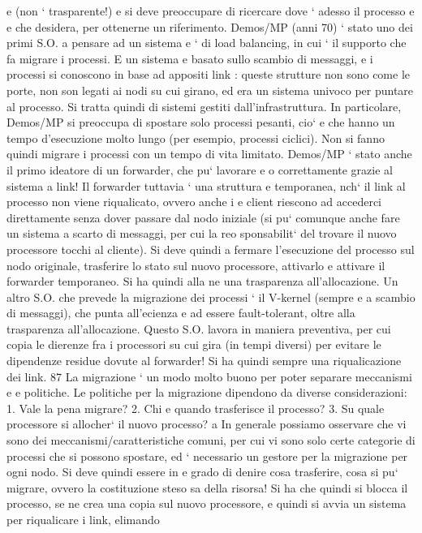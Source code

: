 \documentclass[a4paper,12pt]{article}
\begin{document}
e
(non ` trasparente!) e si deve preoccupare di ricercare dove ` adesso il processo
e
e
che desidera, per ottenerne un riferimento.
Demos/MP (anni 70) ` stato uno dei primi S.O. a pensare ad un sistema
e
`
di load balancing, in cui ` il supporto che fa migrare i processi. E un sistema
e
basato sullo scambio di messaggi, e i processi si conoscono in base ad appositi
link : queste strutture non sono come le porte, non son legati ai nodi su cui
girano, ed era un sistema univoco per puntare al processo. Si tratta quindi di
sistemi gestiti dall'infrastruttura.
In particolare, Demos/MP si preoccupa di spostare solo processi pesanti, cio`
e
che hanno un tempo d'esecuzione molto lungo (per esempio, processi ciclici).
Non si fanno quindi migrare i processi con un tempo di vita limitato.
Demos/MP ` stato anche il primo ideatore di un forwarder, che pu` lavorare
e
o
correttamente grazie al sistema a link! Il forwarder tuttavia ` una struttura
e
temporanea, nch` il link al processo non viene riqualicato, ovvero anche i
e
client riescono ad accederci direttamente senza dover passare dal nodo iniziale
(si pu` comunque anche fare un sistema a scarto di messaggi, per cui la reo
sponsabilit` del trovare il nuovo processore tocchi al cliente). Si deve quindi
a
fermare l'esecuzione del processo sul nodo originale, trasferire lo stato sul nuovo
processore, attivarlo e attivare il forwarder temporaneo. Si ha quindi alla ne
una trasparenza all'allocazione.
Un altro S.O. che prevede la migrazione dei processi ` il V-kernel (sempre
e
a scambio di messaggi), che punta all'ecienza e ad essere fault-tolerant, oltre
alla trasparenza all'allocazione. Questo S.O. lavora in maniera preventiva, per
cui copia le dierenze fra i processori su cui gira (in tempi diversi) per evitare
le dipendenze residue dovute al forwarder! Si ha quindi sempre una riqualicazione dei link.
87
La migrazione ` un modo molto buono per poter separare meccanismi e
e
politiche. Le politiche per la migrazione dipendono da diverse considerazioni:
1. Vale la pena migrare?
2. Chi e quando trasferisce il processo?
3. Su quale processore si allocher` il nuovo processo?
a
In generale possiamo osservare che vi sono dei meccanismi/caratteristiche comuni, per cui vi sono solo certe categorie
di processi che si possono spostare, ed
` necessario un gestore per la migrazione per ogni nodo. Si deve quindi essere in
e
grado di denire cosa trasferire, cosa si pu` migrare, ovvero la costituzione steso
sa della risorsa! Si ha che quindi si blocca il processo, se ne crea una copia sul
nuovo processore, e quindi si avvia un sistema per riqualicare i link, elimando
\end{document}
